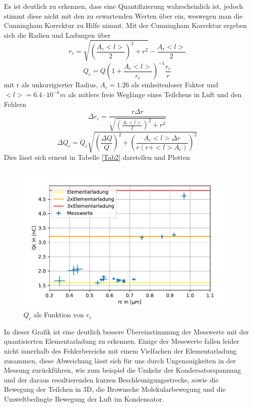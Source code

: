 \documentclass{scrartcl}
\begin{document}
            Es ist deutlich zu erkennen, dass eine Quantifizierung wahrscheinlich ist, jedoch stimmt diese
            nicht mit den zu erwartenden Werten über ein, weswegen man die Cunningham Korrektur zu Hilfe nimmt.
            Mit der Cunningham Korrektur ergeben sich die Radien und Ladungen über
            \begin{equation}
                r_c = \sqrt{(\frac{A_c <l>}{2})^2 + r^2} - \frac{A_c <l>}{2}  
            \end{equation}
            \begin{equation}
                Q_c = Q(1+\frac{A_c<l>}{r_c})^{-1} \frac{r_c}{r}
            \end{equation}
            mit r als unkorrigierter Radius, $A_c=1.26$ als einheitenloser Faktor und $<l>=6.4\cdot 10^{-8} m$ als
            mitlere freie Weglänge eines Teilchens in Luft und den Fehlern
            \begin{equation}
                \Delta r_c = \frac{r \Delta r}{\sqrt{(\frac{A_c <l>}{2})^2 + r^2}}
            \end{equation}
            \begin{equation}
                \Delta Q_c = Q_c \sqrt{(\frac{\Delta Q}{Q})^2 + (\frac{A_c <l> \Delta r}{r(r+<l>A_c)})^2}
            \end{equation}
            Dies lässt sich erneut in Tabelle \ref{Tab2} darstellen und Plotten

            
            
            \begin{figure}[H]
                \centering
                \includegraphics[width=1.0\textwidth]{QoverRUncorrCunt.pdf}
                \caption{$Q_c$ als Funktion von $r_c$}
            \end{figure}
            In dieser Grafik ist eine deutlich bessere Übereinstimmung der Messwerte mit der quantisierten Elementarladung zu
            erkennen. Einige der Messwerte fallen leider nicht innerhalb des Fehlerbereichs mit einem Vielfachen der Elementarladung
            zusammen, diese Abweichung lässt sich für uns durch Ungenauigkeiten in der Messung zurückführen, wie zum beispiel
            die Umkehr der Kondersatorspannung und der daraus resultierenden kurzen Beschleunigungsstrecke, sowie die Bewegung der
            Teilchen in 3D, die Brownsche Molekularbewegung und die Umweltbedingte Bewegung der Luft im Kondensator.
            
\end{document}
